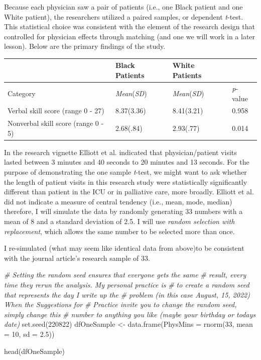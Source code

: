 \documentclass[
  11pt,
]{book}
\newenvironment{Shaded}{\begin{snugshade}}{\end{snugshade}}
\newcommand{\AttributeTok}[1]{\textcolor[rgb]{0.77,0.63,0.00}{#1}}
\newcommand{\CommentTok}[1]{\textcolor[rgb]{0.56,0.35,0.01}{\textit{#1}}}
\newcommand{\DecValTok}[1]{\textcolor[rgb]{0.00,0.00,0.81}{#1}}
\newcommand{\FloatTok}[1]{\textcolor[rgb]{0.00,0.00,0.81}{#1}}
\newcommand{\FunctionTok}[1]{\textcolor[rgb]{0.00,0.00,0.00}{#1}}
\newcommand{\NormalTok}[1]{#1}
\newcommand{\OtherTok}[1]{\textcolor[rgb]{0.56,0.35,0.01}{#1}}
\begin{document}
Because each physician saw a pair of patients (i.e., one Black patient and one White patient), the researchers utilized a paired samples, or dependent \emph{t}-test. This statistical choice was consistent with the element of the research design that controlled for physician effects through matching (and one we will work in a later lesson). Below are the primary findings of the study.

\begin{longtable}[]{@{}llll@{}}
\toprule()
& Black Patients & White Patients & \\
\midrule()
\endhead
Category & \emph{Mean}(\emph{SD}) & \emph{Mean}(\emph{SD}) & \emph{p}-value \\
Verbal skill score (range 0 - 27) & 8.37(3.36) & 8.41(3.21) & 0.958 \\
Nonverbal skill score (range 0 - 5) & 2.68(.84) & 2.93(.77) & 0.014 \\
\bottomrule()
\end{longtable}

In the research vignette Elliott et al. \citeyearpar{elliott_differences_2016} indicated that physician/patient visits lasted between 3 minutes and 40 seconds to 20 minutes and 13 seconds. For the purpose of demonstrating the one sample \emph{t}-test, we might want to ask whether the length of patient visits in this research study were statistically significantly different than patient in the ICU or in palliative care, more broadly. Elliott et al.\citeyearpar{elliott_differences_2016} did not indicate a measure of central tendency (i.e., mean, mode, median) therefore, I will simulate the data by randomly generating 33 numbers with a mean of 8 and a standard deviation of 2.5. I will use \emph{random selection with replacement}, which allows the same number to be selected more than once.

I re-simulated (what may seem like identical data from above)to be consistent with the journal article's research sample of 33.

\begin{Shaded}
\begin{Highlighting}[]
\CommentTok{\# Setting the \textquotesingle{}random\textquotesingle{} seed ensures that everyone gets the same}
\CommentTok{\# result, every time they rerun the analysis. My personal practice is}
\CommentTok{\# to create a random seed that represents the day I write up the}
\CommentTok{\# problem (in this case August, 15, 2022) When the Suggestions for}
\CommentTok{\# Practice invite you to \textquotesingle{}change the random seed,\textquotesingle{} simply change this}
\CommentTok{\# number to anything you like (maybe your birthday or today\textquotesingle{}s date)}
\FunctionTok{set.seed}\NormalTok{(}\DecValTok{220822}\NormalTok{)}
\NormalTok{dfOneSample }\OtherTok{\textless{}{-}} \FunctionTok{data.frame}\NormalTok{(}\AttributeTok{PhysMins =} \FunctionTok{rnorm}\NormalTok{(}\DecValTok{33}\NormalTok{, }\AttributeTok{mean =} \DecValTok{10}\NormalTok{, }\AttributeTok{sd =} \FloatTok{2.5}\NormalTok{))}

\FunctionTok{head}\NormalTok{(dfOneSample)}
\end{Highlighting}
\end{Shaded}
\end{document}
